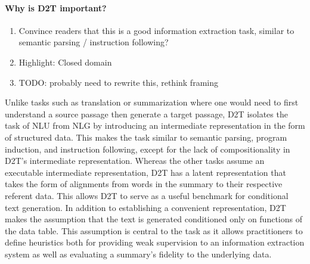 \documentclass[11pt]{article}
\begin{document}
\paragraph{Why is D2T important?}
\begin{enumerate}
\item Convince readers that this is a good information extraction task,
similar to semantic parsing / instruction following?
\item Highlight: Closed domain
\item TODO: probably need to rewrite this, rethink framing
\end{enumerate}
Unlike tasks such as translation or summarization where one would
need to first understand a source passage then generate a target passage,
D2T isolates the task of NLU from NLG by introducing an intermediate representation in
the form of structured data.
This makes the task similar to semantic parsing, program induction, and instruction following,
except for the lack of compositionality in D2T's intermediate representation.
Whereas the other tasks assume an executable intermediate representation,
D2T has a latent representation that takes the form of alignments from 
words in the summary to their respective referent data.
This allows D2T to serve as a useful benchmark for conditional text generation.
In addition to establishing a convenient representation,
D2T makes the assumption that the text is generated conditioned only on
functions of the data table.
This assumption is central to the task as it allows
practitioners to define heuristics both for providing weak supervision to an
information extraction system as well as evaluating a summary's fidelity
to the underlying data.


\end{document}
